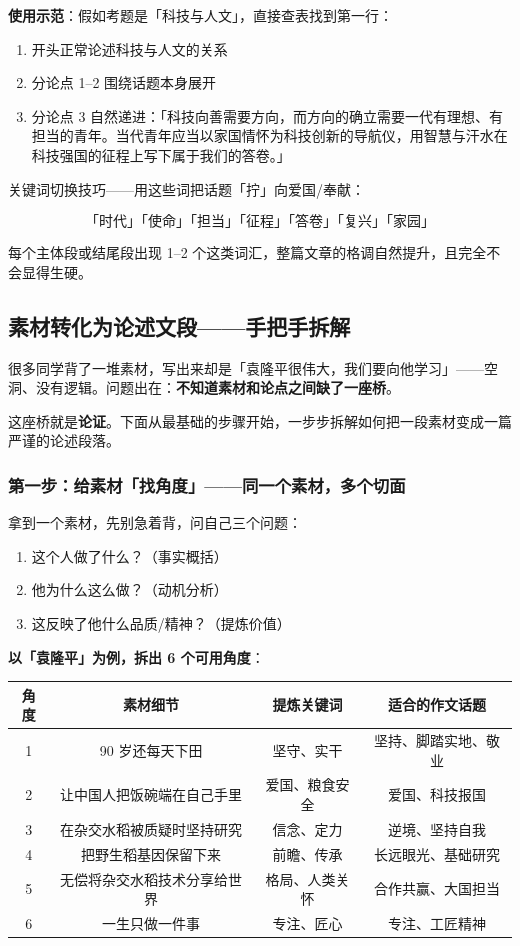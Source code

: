 \textbf{使用示范}：假如考题是「科技与人文」，直接查表找到第一行：

\begin{enumerate}
  \item 开头正常论述科技与人文的关系
  \item 分论点 1--2 围绕话题本身展开
  \item 分论点 3 自然递进：「科技向善需要方向，而方向的确立需要一代有理想、有担当的青年。当代青年应当以家国情怀为科技创新的导航仪，用智慧与汗水在科技强国的征程上写下属于我们的答卷。」
\end{enumerate}

关键词切换技巧——用这些词把话题「拧」向爱国/奉献：

\[
\textbf{「时代」「使命」「担当」「征程」「答卷」「复兴」「家园」}
\]

每个主体段或结尾段出现 1--2 个这类词汇，整篇文章的格调自然提升，且完全不会显得生硬。

\subsection{素材转化为论述文段——手把手拆解}

很多同学背了一堆素材，写出来却是「袁隆平很伟大，我们要向他学习」——空洞、没有逻辑。问题出在：\textbf{不知道素材和论点之间缺了一座桥}。

这座桥就是\textbf{论证}。下面从最基础的步骤开始，一步步拆解如何把一段素材变成一篇严谨的论述段落。

\subsubsection{第一步：给素材「找角度」——同一个素材，多个切面}

拿到一个素材，先别急着背，问自己三个问题：

\begin{enumerate}
  \item 这个人做了什么？（事实概括）
  \item 他为什么这么做？（动机分析）
  \item 这反映了他什么品质/精神？（提炼价值）
\end{enumerate}

\textbf{以「袁隆平」为例，拆出 6 个可用角度}：

\begin{center}
\begin{tabular}{c|c|c|c}
\textbf{角度} & \textbf{素材细节} & \textbf{提炼关键词} & \textbf{适合的作文话题} \\ \hline
1 & 90 岁还每天下田 & 坚守、实干 & 坚持、脚踏实地、敬业 \\
2 & 让中国人把饭碗端在自己手里 & 爱国、粮食安全 & 爱国、科技报国 \\
3 & 在杂交水稻被质疑时坚持研究 & 信念、定力 & 逆境、坚持自我 \\
4 & 把野生稻基因保留下来 & 前瞻、传承 & 长远眼光、基础研究 \\
5 & 无偿将杂交水稻技术分享给世界 & 格局、人类关怀 & 合作共赢、大国担当 \\
6 & 一生只做一件事 & 专注、匠心 & 专注、工匠精神 \\
\end{tabular}
\end{center}

